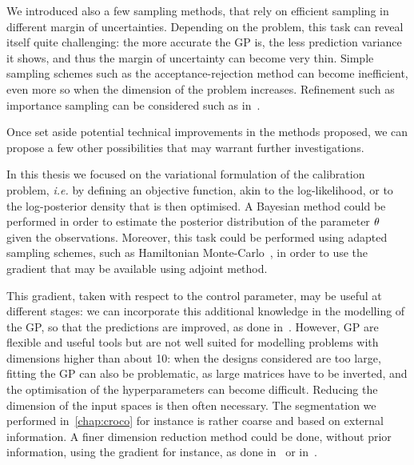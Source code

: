 \documentclass[../../Main_ManuscritThese.tex]{subfiles}
\begin{document}
We introduced also a few sampling methods, that rely on efficient
sampling in different margin of uncertainties. Depending on the
problem, this task can reveal itself quite challenging: the more
accurate the GP is, the less prediction variance it shows, and thus
the margin of uncertainty can become very thin. Simple sampling
schemes such as the acceptance-rejection method can become
inefficient, even more so when the dimension of the problem
increases. Refinement such as importance sampling can be considered
such as in~\cite{razaaly_rare_2019}.

Once set aside potential technical improvements in the methods
proposed, we can propose a few other possibilities that may warrant
further investigations.

In this thesis we focused on the variational
formulation of the calibration problem, \emph{i.e.} by defining an
objective function, akin to the log-likelihood, or to the
log-posterior density that is then optimised. A Bayesian method could
be performed in order to estimate the posterior distribution of the
parameter $\theta$ given the observations. Moreover, this task could be
performed using adapted sampling schemes, such as Hamiltonian
Monte-Carlo~\citep{betancourt_conceptual_2017}, in order to use the
gradient that may be available using adjoint method.

This gradient, taken with respect to the control parameter, may be
useful at different stages: we can incorporate this additional
knowledge in the modelling of the GP, so that the predictions are
improved, as done
in~\cite{bouhlel_gradient-enhanced_2019,laurent_overview_2019}.
However, GP are flexible and useful tools but are not well suited for
modelling problems with dimensions higher than about 10: when the
designs considered are too large, fitting the GP can also be
problematic, as large matrices have to be inverted, and the
optimisation of the hyperparameters can become difficult. Reducing the
dimension of the input spaces is then often necessary.
The segmentation we performed in~\cref{chap:croco} for instance is
rather coarse and based on external information. A finer dimension
reduction method could be done, without prior information, using the
gradient for instance, as done in~\cite{benameur_refinement_2002} or
in~\cite{zahm_certified_2018}.
\end{document}
